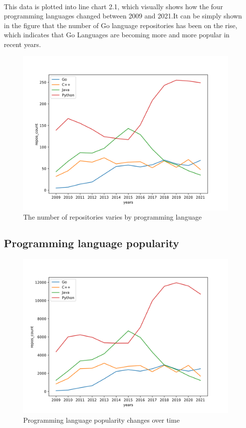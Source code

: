 \documentclass[11pt,onside,a4paper,fleqn]{report}
\begin{document}
\paragraph{} This data is plotted into line chart 2.1, which visually shows how the four programming languages changed between 2009 and 2021.It can be simply shown in the figure that the number of Go language repositories has been on the rise, which indicates that Go
Languages are becoming more and more popular in recent years.

\begin{figure}[ht]
\centering
\includegraphics[scale=0.6]{result/yearsChange.png}
\caption{The number of repositories varies by programming language}
\label{fig:pathdemo4}
\end{figure}

\subsection{Programming language popularity}

\begin{figure}[ht]
\centering
\includegraphics[scale=0.6]{result/yearsChange_modifed.png}
\caption{Programming language popularity changes over time}
\label{fig:pathdemo4}
\end{figure}
\end{document}

